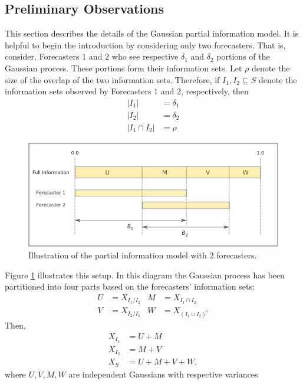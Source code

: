 \documentclass[11pt]{article}
\theoremstyle{definition}
\theoremstyle{definition}
\begin{document}
\subsection{Preliminary Observations}
\label{prelim}
This section describes the details of the Gaussian partial information model. It is helpful to begin the introduction by considering only 
two forecasters.  That is, consider, Forecasters $1$ and $2$ who see respective 
$\delta_1$ and $\delta_2$ portions of the Gaussian process. 
These portions form their information sets.  Let $\rho$ denote
the size of the overlap of the two information sets.
Therefore, if $I_1, I_2 \subseteq S$ denote the information 
sets observed by Forecasters $1$ and $2$, respectively, then
\begin{align*}
|I_1| &= \delta_1\\
|I_2| &= \delta_2\\
|I_1 \cap I_2| &= \rho
\end{align*}
\begin{figure}[htbp]
   \includegraphics[width = \textwidth]{N=2} %
   \caption{Illustration of the partial information model with $2$ forecasters.}
   \label{diagram2}
\end{figure}
Figure \ref{diagram2} illustrates this setup.  In this diagram the 
Gaussian process has been partitioned into four parts based on the 
forecasters' information sets:
\begin{align*}
 U &= X_{I_1 / I_2}
& M &= X_{I_1 \cap I_2}\\
 V &= X_{I_2 / I_1}
& W &= X_{(I_1 \cup I_2)^c}
\end{align*}
Then,
\begin{align*}
X_{I_1} &= U + M\\
X_{I_2} &= M + V\\
X_S &= U+M+V+W,
\end{align*}
where $U, V, M, W$ are independent Gaussians with respective variances 
\end{document}
